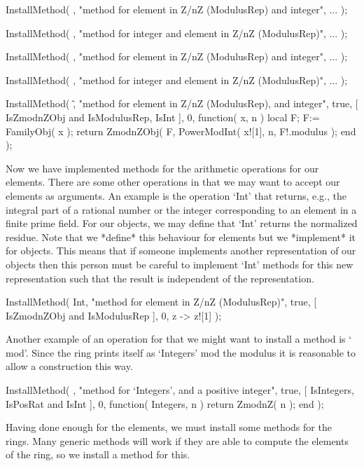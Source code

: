     InstallMethod( \*,
        "method for element in Z/nZ (ModulusRep) and integer",
        ... );

    InstallMethod( \*,
        "method for integer and element in Z/nZ (ModulusRep)",
        ... );

    InstallMethod( \/,
        "method for element in Z/nZ (ModulusRep) and integer",
        ... );

    InstallMethod( \/,
        "method for integer and element in Z/nZ (ModulusRep)",
        ... );

    InstallMethod( \^,
        "method for element in Z/nZ (ModulusRep), and integer",
        true,
        [ IsZmodnZObj and IsModulusRep, IsInt ], 0,
        function( x, n )
        local F;
        F:= FamilyObj( x );
        return ZmodnZObj( F, PowerModInt( x![1], n, F!.modulus );
        end );
\endexample

Now we have implemented methods for the arithmetic operations for our
elements.
There are some other operations in {\GAP} that we may want to accept
our elements as arguments.
An example is the operation `Int' that returns, e.g.,
the integral part of a rational number or the integer corresponding to
an element in a finite prime field.
For our objects, we may define that `Int' returns the normalized residue.
Note that we *define* this behaviour for elements
but we *implement* it for objects.
This means that if someone implements another representation of our
objects then this person must be careful to implement `Int' methods for
this new representation such that the result is independent of the
representation.

\beginexample
    InstallMethod( Int,
        "method for element in Z/nZ (ModulusRep)",
        true,
        [ IsZmodnZObj and IsModulusRep ], 0,
        z -> z![1] );
\endexample

Another example of an operation for that we might want to install
a method is `\\mod'.
Since the ring prints itself as `Integers' mod the modulus
it is reasonable to allow a construction this way.

\beginexample
    InstallMethod( \mod,
        "method for `Integers', and a positive integer",
        true,
        [ IsIntegers, IsPosRat and IsInt ], 0,
        function( Integers, n ) return ZmodnZ( n ); end );
\endexample

Having done enough for the elements,
we must install some methods for the rings.
Many generic methods will work if they are able to compute the
elements of the ring,
so we install a method for this.

